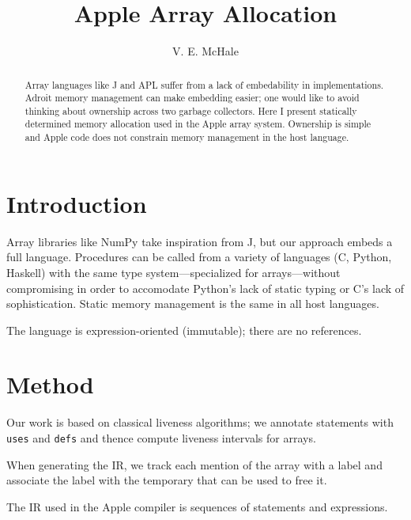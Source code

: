 \documentclass{article}
\begin{document}
\title{Apple Array Allocation}
\author{V. E. McHale}
\maketitle

\begin{abstract}
    Array languages like J and APL suffer from a lack of embedability in implementations. Adroit memory management can make embedding easier; one would like to avoid thinking about ownership across two garbage collectors. Here I present statically determined memory allocation used in the Apple array system. Ownership is simple and Apple code does not constrain memory management in the host language.
\end{abstract}

\section{Introduction}

Array libraries like NumPy take inspiration from J, but our approach embeds a full language. Procedures can be called from a variety of languages (C, Python, Haskell) with the same type system---specialized for arrays---without compromising in order to accomodate Python's lack of static typing or C's lack of sophistication. Static memory management is the same in all host languages.


The language is expression-oriented (immutable); there are no references.

\section{Method}

Our work is based on classical liveness algorithms; we annotate statements with {\tt uses} and {\tt defs} and thence compute liveness intervals for arrays. %

When generating the IR, we track each mention of the array with a label and associate the label with the temporary that can be used to free it.


The IR used in the Apple compiler is sequences of statements and expressions.
\end{document}
